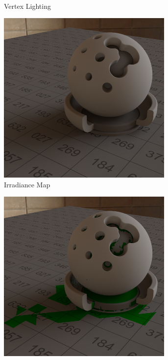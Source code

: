 \begin{figure}[p]
\begin{subfigure}[t]{0.245\textwidth}
				\caption{Vertex Lighting}
			\end{subfigure}
			\begin{subfigure}[t]{0.245\textwidth}
				\center
				\includegraphics[width=0.95\textwidth]{pic/irrmap-shaderball_e-irrmap.png}
				\caption{Irradiance Map}
			\end{subfigure}
			\begin{subfigure}[t]{0.245\textwidth}
				\center
				\includegraphics[width=0.95\textwidth]{pic/irrmap-shaderball_e-irrmap-order.png}

\end{subfigure}
\end{figure}

